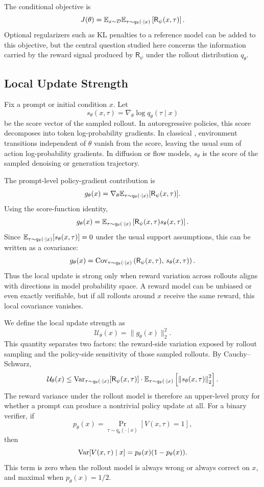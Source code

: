 The conditional objective is
\[
  J(\theta)
  =
  \mathbb{E}_{x\sim \mathcal{D}}
  \mathbb{E}_{\tau\sim q_\theta(\cdot\mid x)}
  \left[
    \mathsf{R}_\psi(x,\tau)
  \right].
\]
Optional regularizers such as KL penalties to a reference model can be added to this objective, but the central question studied here concerns the information carried by the reward signal produced by $\mathsf{R}_\psi$ under the rollout distribution $q_\theta$.

\subsection{Local Update Strength}

Fix a prompt or initial condition $x$. Let
\[
  s_\theta(x,\tau)=\nabla_\theta \log q_\theta(\tau\mid x)
\]
be the score vector of the sampled rollout. In autoregressive \llm{} policies, this score decomposes into token log-probability gradients. In classical \rl{}, environment transitions independent of $\theta$ vanish from the score, leaving the usual sum of action log-probability gradients. In diffusion or flow models, $s_\theta$ is the score of the sampled denoising or generation trajectory.

The prompt-level policy-gradient contribution is
\[
  g_\theta(x)
  =
  \nabla_\theta
  \mathbb{E}_{\tau\sim q_\theta(\cdot\mid x)}
  [\mathsf{R}_\psi(x,\tau)].
\]
Using the score-function identity,
\[
  g_\theta(x)
  =
  \mathbb{E}_{\tau\sim q_\theta(\cdot\mid x)}
  \left[
    \mathsf{R}_\psi(x,\tau)s_\theta(x,\tau)
  \right].
\]
Since $\mathbb{E}_{\tau\sim q_\theta(\cdot\mid x)}[s_\theta(x,\tau)]=0$ under the usual support assumptions, this can be written as a covariance:
\[
  g_\theta(x)
  =
  \mathrm{Cov}_{\tau\sim q_\theta(\cdot\mid x)}
  \left(
    \mathsf{R}_\psi(x,\tau),\,
    s_\theta(x,\tau)
  \right).
\]
Thus the local update is strong only when reward variation across rollouts aligns with directions in model probability space. A reward model can be unbiased or even exactly verifiable, but if all rollouts around $x$ receive the same reward, this local covariance vanishes.

We define the local update strength as
\[
  \mathcal{U}_\theta(x)=\|g_\theta(x)\|_2^2.
\]
This quantity separates two factors: the reward-side variation exposed by rollout sampling and the policy-side sensitivity of those sampled rollouts. By Cauchy--Schwarz,
\[
  \mathcal{U}_\theta(x)
  \le
  \mathrm{Var}_{\tau\sim q_\theta(\cdot\mid x)}
  [\mathsf{R}_\psi(x,\tau)]
  \cdot
  \mathbb{E}_{\tau\sim q_\theta(\cdot\mid x)}
  \left[
    \left\|s_\theta(x,\tau)\right\|_2^2
  \right].
\]
The reward variance under the rollout model is therefore an upper-level proxy for whether a prompt can produce a nontrivial policy update at all. For a binary verifier, if
\[
  p_\theta(x)=\Pr_{\tau\sim q_\theta(\cdot\mid x)}[V(x,\tau)=1],
\]
then
\[
  \mathrm{Var}[V(x,\tau)\mid x]=p_\theta(x)(1-p_\theta(x)).
\]
This term is zero when the rollout model is always wrong or always correct on $x$, and maximal when $p_\theta(x)=1/2$.

